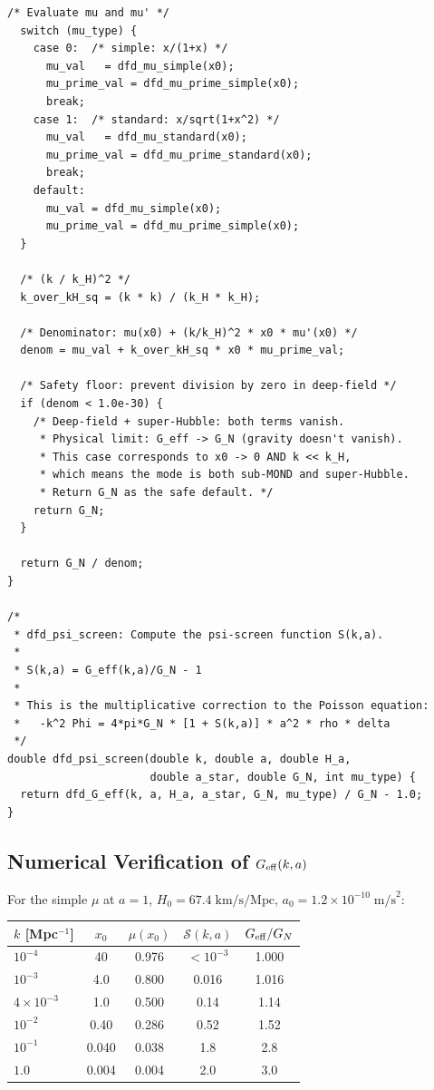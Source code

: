 \documentclass[11pt]{article}
\theoremstyle{definition}
\theoremstyle{remark}
\newcommand{\ee}[1]{\times 10^{#1}}
\newcommand{\Geff}{G_{\rm eff}}
\begin{document}
\begin{lstlisting}[caption={Complete \texttt{dfd\_G\_eff()} function in C},
  label={lst:geff}]
  /* Evaluate mu and mu' */
  switch (mu_type) {
    case 0:  /* simple: x/(1+x) */
      mu_val   = dfd_mu_simple(x0);
      mu_prime_val = dfd_mu_prime_simple(x0);
      break;
    case 1:  /* standard: x/sqrt(1+x^2) */
      mu_val   = dfd_mu_standard(x0);
      mu_prime_val = dfd_mu_prime_standard(x0);
      break;
    default:
      mu_val = dfd_mu_simple(x0);
      mu_prime_val = dfd_mu_prime_simple(x0);
  }

  /* (k / k_H)^2 */
  k_over_kH_sq = (k * k) / (k_H * k_H);

  /* Denominator: mu(x0) + (k/k_H)^2 * x0 * mu'(x0) */
  denom = mu_val + k_over_kH_sq * x0 * mu_prime_val;

  /* Safety floor: prevent division by zero in deep-field */
  if (denom < 1.0e-30) {
    /* Deep-field + super-Hubble: both terms vanish.
     * Physical limit: G_eff -> G_N (gravity doesn't vanish).
     * This case corresponds to x0 -> 0 AND k << k_H,
     * which means the mode is both sub-MOND and super-Hubble.
     * Return G_N as the safe default. */
    return G_N;
  }

  return G_N / denom;
}

/*
 * dfd_psi_screen: Compute the psi-screen function S(k,a).
 *
 * S(k,a) = G_eff(k,a)/G_N - 1
 *
 * This is the multiplicative correction to the Poisson equation:
 *   -k^2 Phi = 4*pi*G_N * [1 + S(k,a)] * a^2 * rho * delta
 */
double dfd_psi_screen(double k, double a, double H_a,
                      double a_star, double G_N, int mu_type) {
  return dfd_G_eff(k, a, H_a, a_star, G_N, mu_type) / G_N - 1.0;
}
\end{lstlisting}

\subsection{Numerical Verification of $\Geff(k,a)$}

For the simple $\mu$ at $a = 1$, $H_0 = 67.4\;\text{km/s/Mpc}$,
$a_0 = 1.2\ee{-10}\;\text{m/s}^2$:

\begin{center}
\begin{tabular}{@{}lcccc@{}}
\toprule
$k$ [Mpc$^{-1}$] & $x_0$ & $\mu(x_0)$ & $\mathcal{S}(k,a)$ &
  $\Geff/G_N$ \\
\midrule
$10^{-4}$ & 40 & 0.976 & $< 10^{-3}$ & 1.000 \\
$10^{-3}$ & 4.0 & 0.800 & 0.016 & 1.016 \\
$4\ee{-3}$ & 1.0 & 0.500 & 0.14 & 1.14 \\
$10^{-2}$ & 0.40 & 0.286 & 0.52 & 1.52 \\
$10^{-1}$ & 0.040 & 0.038 & 1.8 & 2.8 \\
$1.0$ & 0.004 & 0.004 & 2.0 & 3.0 \\
\bottomrule
\end{tabular}
\end{center}
\end{document}
